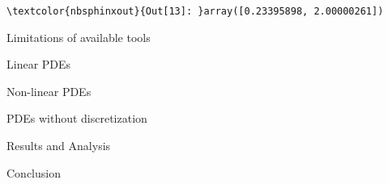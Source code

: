 \documentclass[letterpaper,10pt,english]{sphinxmanual}
\begin{document}
%
\begin{Verbatim}[commandchars=\\\{\}]
\textcolor{nbsphinxout}{Out[13]: }array([0.23395898, 2.00000261])
\end{Verbatim}

Limitations of available tools

Linear PDEs

Non-linear PDEs

PDEs without discretization

Results and Analysis

Conclusion



\renewcommand{\indexname}{Index}
\printindex
\end{document}
